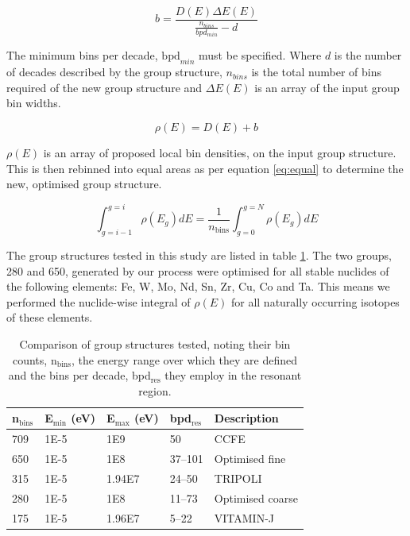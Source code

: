 \begin{equation}
\label{eq:b}
b = \frac{D(E) \Delta E(E)}{\frac{n_{bins}}{bpd_{min}} - d}
\end{equation}

The minimum bins per decade, $\mathrm{bpd}_{min}$ must be specified. Where $d$ is the number of decades described by the group structure, $n_{bins}$ is the total number of bins required of the new group structure and $\Delta E(E)$ is an array of the input group bin widths.

\begin{equation}
\label{eq:offset}
\rho(E) = D(E) + b
\end{equation}

$\rho(E)$ is an array of proposed local bin densities, on the input group structure. This is then rebinned into equal areas as per equation \ref{eq:equal} to determine the new, optimised group structure.

\begin{equation}
\label{eq:equal}
\int_{g=i-1}^{g=i} \rho(E_{g})dE = \frac{1}{n_\mathrm{bins}}\int_{g=0}^{g=N}\rho(E_{g})dE \end{equation} 

The group structures tested in this study are listed in table \ref{tab:groups}. The two groups, 280 and 650, generated by our process were optimised for all stable nuclides of the following elements: Fe, W, Mo, Nd, Sn, Zr, Cu, Co and Ta. This means we performed the nuclide-wise integral of $\rho(E)$ for all naturally occurring isotopes of these elements. 

\begin{table}[H]
  \centering
  \begin{tabular}{lllll}
    \toprule
    n$_\mathrm{bins}$ & E$_\mathrm{min}$ (eV) & E$_\mathrm{max}$ (eV) & bpd$_\mathrm{res}$ & Description \\ 
    \midrule
    709 & 1E-5 & 1E9 & 50 & CCFE \\
    650 & 1E-5 & 1E8 & 37--101 & Optimised fine \\
    315 & 1E-5 & 1.94E7 & 24--50 & TRIPOLI  \\
    280 & 1E-5 & 1E8 & 11--73 & Optimised coarse \\ 
    175 & 1E-5 & 1.96E7 & 5--22 & VITAMIN-J \\
    \bottomrule
  \end{tabular}
  \caption{Comparison of group structures tested, noting their bin counts, n$_\mathrm{bins}$, the energy range over which they are defined and the bins per decade, bpd$_\mathrm{res}$ they employ in the resonant region.}
  \label{tab:groups}
\end{table}

